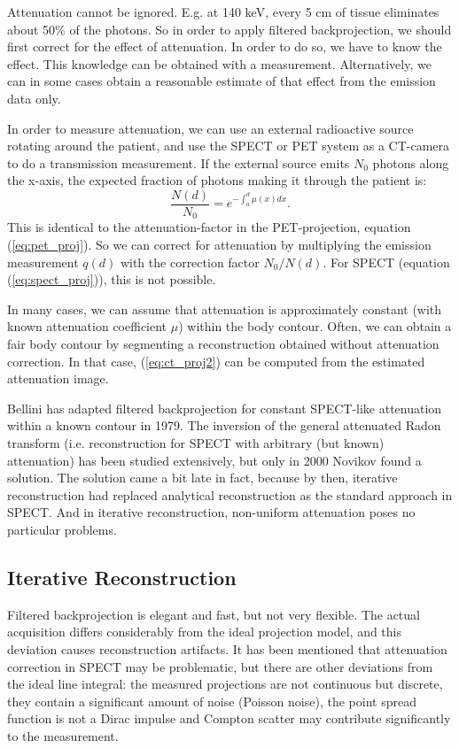 Attenuation cannot be ignored. E.g. at 140 keV, every 5 cm of tissue eliminates
about 50\% of the photons. So in order to apply filtered backprojection, we
should first correct for the effect of attenuation. In order to do so, we have
to know the effect. This knowledge can be obtained with a measurement.
Alternatively, we can in some cases obtain a reasonable estimate of that effect
from the emission data only.

In order to measure attenuation, we can use an external radioactive source
rotating around the patient, and use the SPECT or PET system as a CT-camera to
do a transmission measurement. If the external source emits $N_0$ photons
along the x-axis, the expected fraction of photons making it through the
patient is:
\begin{equation}
\frac{N(d)}{N_0} = e^{-\int_a^d \mu(x) dx} \label{eq:ct_proj2}.
\end{equation}
This is identical to the attenuation-factor in the PET-projection, equation
(\ref{eq:pet_proj}). So we can correct for attenuation by multiplying the
emission measurement $q(d)$ with the correction factor $N_0 / N(d)$.
For SPECT (equation (\ref{eq:spect_proj})), this is not possible.

In many cases, we can assume that attenuation is approximately constant (with
known attenuation coefficient $\mu$) within the body contour. Often, we can
obtain a fair body contour by segmenting a reconstruction obtained without
attenuation correction. In that case, (\ref{eq:ct_proj2}) can be computed from
the estimated attenuation image.

Bellini has adapted filtered backprojection for constant SPECT-like attenuation
within a known contour in 1979. The inversion of the general attenuated Radon
transform (i.e. reconstruction for SPECT with arbitrary (but known) attenuation) has
been studied extensively, but only in 2000 Novikov found a solution. The solution
came a bit late in fact, because by then, iterative reconstruction had replaced
analytical reconstruction as the standard approach in SPECT. And in iterative
reconstruction, non-uniform attenuation poses no particular problems.

\subsection{Iterative Reconstruction} \label{sec:iterrecon}
Filtered backprojection is elegant and fast, but not very
flexible. The actual acquisition differs considerably from the ideal
projection model, and this deviation causes reconstruction
artifacts. It has been mentioned that attenuation correction in SPECT
may be problematic, but there are other deviations from the ideal line
integral: the measured projections are not continuous but discrete,
they contain a significant amount of noise (Poisson noise), the point
spread function is not a Dirac impulse and Compton scatter may
contribute significantly to the measurement.

